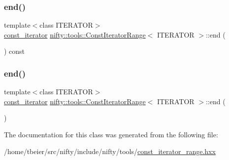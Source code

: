 \mbox{\label{classnifty_1_1tools_1_1ConstIteratorRange_a1e840d8c32a5eca80b8852ff28af68cc}} 
\subsubsection{\texorpdfstring{end()}{end()}\hspace{0.1cm}{\footnotesize\ttfamily [1/2]}}
{\footnotesize\ttfamily template$<$class I\+T\+E\+R\+A\+T\+OR$>$ \\
\hyperlink{classnifty_1_1tools_1_1ConstIteratorRange_afb02141878a935f32f828810a2be648b}{const\+\_\+iterator} \hyperlink{classnifty_1_1tools_1_1ConstIteratorRange}{nifty\+::tools\+::\+Const\+Iterator\+Range}$<$ I\+T\+E\+R\+A\+T\+OR $>$\+::end (\begin{DoxyParamCaption}{ }\end{DoxyParamCaption}) const\hspace{0.3cm}{\ttfamily [inline]}}

\mbox{\label{classnifty_1_1tools_1_1ConstIteratorRange_add87b395b12e7ab2724c5ed61f04163f}} 
\subsubsection{\texorpdfstring{end()}{end()}\hspace{0.1cm}{\footnotesize\ttfamily [2/2]}}
{\footnotesize\ttfamily template$<$class I\+T\+E\+R\+A\+T\+OR$>$ \\
\hyperlink{classnifty_1_1tools_1_1ConstIteratorRange_afb02141878a935f32f828810a2be648b}{const\+\_\+iterator} \hyperlink{classnifty_1_1tools_1_1ConstIteratorRange}{nifty\+::tools\+::\+Const\+Iterator\+Range}$<$ I\+T\+E\+R\+A\+T\+OR $>$\+::end (\begin{DoxyParamCaption}{ }\end{DoxyParamCaption})\hspace{0.3cm}{\ttfamily [inline]}}



The documentation for this class was generated from the following file\+:\begin{DoxyCompactItemize}
\item 
/home/tbeier/src/nifty/include/nifty/tools/\hyperlink{const__iterator__range_8hxx}{const\+\_\+iterator\+\_\+range.\+hxx}\end{DoxyCompactItemize}
